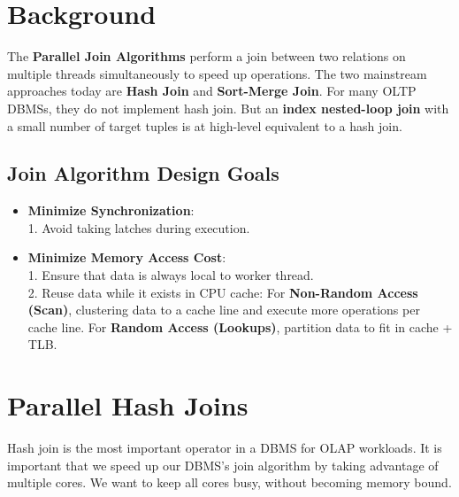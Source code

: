 \documentclass[11pt]{article}
\begin{document}
\maketitle
\thispagestyle{plain}

\section{Background}
The \textbf{Parallel Join Algorithms} perform a join between two relations on multiple threads simultaneously to speed up operations. The two mainstream approaches today are \textbf{Hash Join} and \textbf{Sort-Merge Join}. For many OLTP DBMSs, they do not implement hash join. But an \textbf{index nested-loop join} with a small number of target tuples is at high-level equivalent to a hash join.

\subsection*{Join Algorithm Design Goals}
\begin{itemize}
	\item \textbf{Minimize Synchronization}:\\
	1. Avoid taking latches during execution.
	
	\item \textbf{Minimize Memory Access Cost}:\\
	1. Ensure that data is always local to worker thread.\\
	2. Reuse data while it exists in CPU cache: For \textbf{Non-Random Access (Scan)}, clustering data to a cache line and execute more operations per cache line. For \textbf{Random Access (Lookups)}, partition data to fit in cache + TLB. 
\end{itemize}


\section{Parallel Hash Joins}
Hash join is the most important operator in a DBMS for OLAP workloads. It is important that we speed up our DBMS's join algorithm by taking advantage of multiple cores. We want to keep all cores busy, without becoming memory bound.
\end{document}

